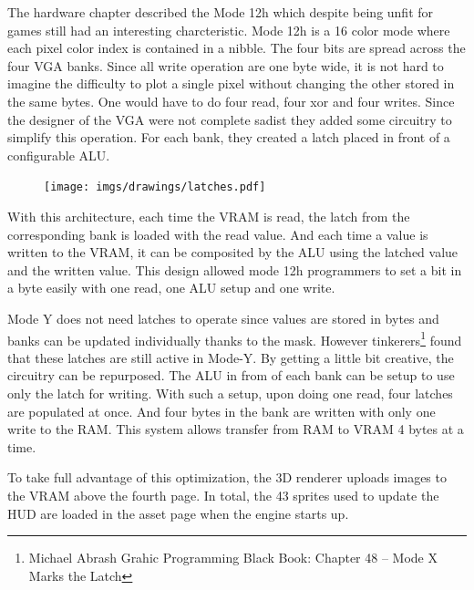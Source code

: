 The hardware chapter described the Mode 12h which despite being unfit for games still had an interesting charcteristic. Mode 12h is a 16 color mode where each pixel color index is contained in a nibble. The four bits are spread across the four VGA banks. Since all write operation are one byte wide, it is not hard to imagine the difficulty to plot a single pixel without changing the other stored in the same bytes. One would have to do four read, four xor and four writes. Since the designer of the VGA were not complete sadist they added some circuitry to simplify this operation. For each bank, they created a latch placed in front of a configurable ALU.\\
\par
 \begin{figure}[H]
\centering
 \texttt{[image: imgs/drawings/latches.pdf]}
 \end{figure}
With this architecture, each time the VRAM is read, the latch from the corresponding bank is loaded with the read value. And each time a value is written to the VRAM, it can be composited by the ALU using the latched value and the written value. This design allowed mode 12h programmers to set a bit in a byte easily with one read, one ALU setup and one write.\\
\par
Mode Y does not need latches to operate since values are stored in bytes and banks can be updated individually thanks to the mask. However tinkerers\footnote{Michael Abrash Grahic Programming Black Book: Chapter 48 -- Mode X Marks the Latch} found that these latches are still active in  Mode-Y. By getting a little bit creative, the circuitry can be repurposed. The ALU in from of each bank can be setup to use only the latch for writing. With such a setup, upon doing one read, four latches are populated at once. And four bytes in the bank are written with only one write to the RAM. This system allows transfer from RAM to VRAM 4 bytes at a time.\\
\par
To take full advantage of this optimization, the 3D renderer uploads images to the VRAM above the fourth page. In total, the 43 sprites used to update the HUD are loaded in the asset page when the engine starts up.\\

\begin{minipage}{.23\textwidth}
  \end{minipage}
\begin{minipage}{.23\textwidth}
  \end{minipage}
\begin{minipage}{.23\textwidth}
  \end{minipage}
\begin{minipage}{.23\textwidth}
  \end{minipage}
\par


